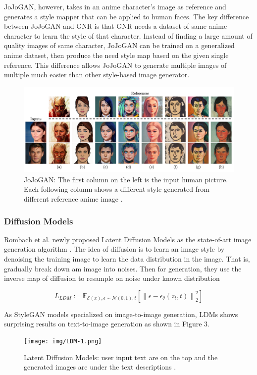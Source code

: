 JoJoGAN, however, takes in an anime character's image as reference and generates
a style mapper that can be applied to human faces.
The key difference between JoJoGAN and GNR is that GNR needs a dataset of same anime character to learn the style of that character.
Instead of finding a large amount of quality images of same character,
JoJoGAN can be trained on a generalized anime dataset,
then produce the need style map based on the given single reference.
This difference allows JoJoGAN to generate multiple images of multiple much easier than other style-based image generator.
\begin{figure}[h]
    \includegraphics[width=\textwidth]{img/JoJo-1.png}
    \caption{
        JoJoGAN: The first column on the left is the input human picture.
        Each following column shows a different style generated from different reference anime image \cite{chong2021jojogan}.
    }
\end{figure}

\subsubsection*{Diffusion Models}

Rombach et al. newly proposed Latent Diffusion Models as the state-of-art image generation algorithm \cite{Rombach2022High}.
The idea of diffusion is to learn an image style by denoising the training image to learn the data distribution in the image.
That is, gradually break down am image into noises.
Then for generation, they use the inverse map of diffusion to resample on noise under known distribution

$$
L_{L D M}:=\mathbb{E}_{\mathcal{E}(x), \epsilon \sim \mathcal{N}(0,1), t}\left[\left\|\epsilon-\epsilon_\theta\left(z_t, t\right)\right\|_2^2\right]
$$

As StyleGAN models specialized on image-to-image generation,
LDMs shows surprising results on text-to-image generation as shown in Figure 3.
\begin{figure}[]
    \texttt{[image: img/LDM-1.png]}
    \caption{
        Latent Diffusion Models:
        user input text are on the top
        and the generated images are under the text descriptions \cite{Rombach2022High}.
    }
\end{figure}

